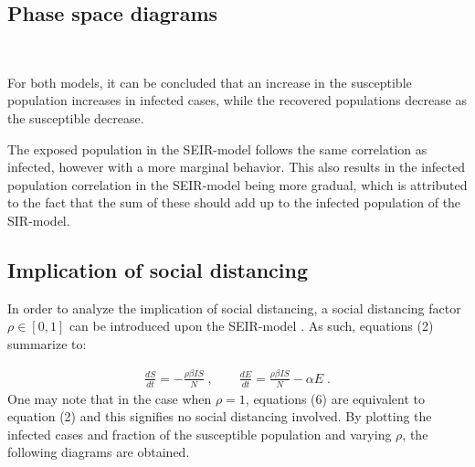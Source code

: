 \documentclass[12pt]{article}
\begin{document}
\subsection{Phase space diagrams}
\begin{figure*}[ht!]
\begin{center}
   \\
   \caption{\label{workflow} (a) SIR - $R_0 = 4$ (b) SEIR - $R_0 = 4$}
\end{center}
\end{figure*}
\noindent For both models, it can be concluded that an increase in the susceptible population increases in infected cases, while the recovered populations decrease as the susceptible decrease. 

The exposed population in the SEIR-model follows the same correlation as infected, however with a more marginal behavior. This also results in the infected population correlation in the SEIR-model being more gradual, which is attributed to the fact that the sum of these should add up to the infected population of the SIR-model.

\newpage 
\subsection{Implication of social distancing}
In order to analyze the implication of social distancing, 
a social distancing factor $\rho \in [0,1]$ can be introduced upon the SEIR-model \cite{gill}. As such, equations (2) summarize to:

\begin{gather}
\frac{dS}{dt} = - \frac{\rho \beta I S}{N} \;, \qquad
\frac{dE}{dt} = \frac{\rho \beta I S}{N}- \alpha E \;.
\end{gather}
One may note that in the case when $\rho = 1$, equations (6) are equivalent to equation (2) and this signifies no social distancing involved. By plotting the infected cases and fraction of  the susceptible population and varying $\rho$, the following diagrams are obtained.

\begin{figure*}[ht!]
\begin{center}
   \\
   \caption{\label{workflow} (a) Infected cases (b) Susceptibility fraction}
\end{center}
\end{figure*}
\end{document}
